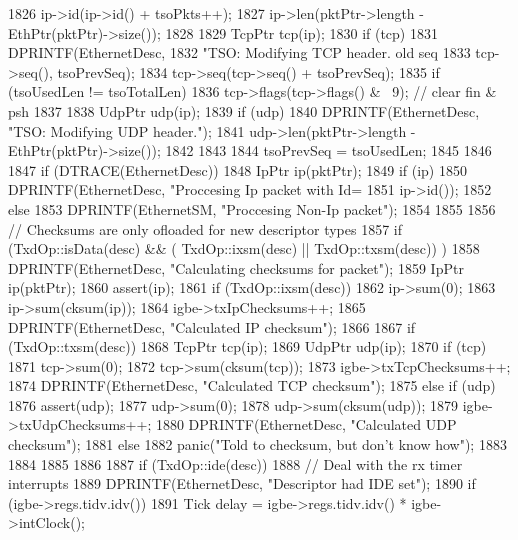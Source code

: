 \begin{DoxyCode}
{{{1826             ip->id(ip->id() + tsoPkts++);
1827             ip->len(pktPtr->length - EthPtr(pktPtr)->size()); 
1828         
1829             TcpPtr tcp(ip);
1830             if (tcp) {
1831                 DPRINTF(EthernetDesc,
1832                         "TSO: Modifying TCP header. old seq %
1833                         tcp->seq(), tsoPrevSeq);
1834                 tcp->seq(tcp->seq() + tsoPrevSeq);
1835                 if (tsoUsedLen != tsoTotalLen)
1836                     tcp->flags(tcp->flags() & ~9); // clear fin & psh
1837             }
1838             UdpPtr udp(ip);
1839             if (udp) {
1840                 DPRINTF(EthernetDesc, "TSO: Modifying UDP header.\n");
1841                 udp->len(pktPtr->length - EthPtr(pktPtr)->size());
1842             }
1843         }
1844         tsoPrevSeq = tsoUsedLen;
1845     }
1846 
1847     if (DTRACE(EthernetDesc)) {
1848         IpPtr ip(pktPtr);
1849         if (ip)
1850             DPRINTF(EthernetDesc, "Proccesing Ip packet with Id=%
1851                     ip->id());
1852         else
1853             DPRINTF(EthernetSM, "Proccesing Non-Ip packet\n");
1854     }
1855 
1856     // Checksums are only ofloaded for new descriptor types
1857     if (TxdOp::isData(desc) && ( TxdOp::ixsm(desc) || TxdOp::txsm(desc)) ) {
1858         DPRINTF(EthernetDesc, "Calculating checksums for packet\n");
1859         IpPtr ip(pktPtr);
1860         assert(ip);
1861         if (TxdOp::ixsm(desc)) {
1862             ip->sum(0);
1863             ip->sum(cksum(ip));
1864             igbe->txIpChecksums++;
1865             DPRINTF(EthernetDesc, "Calculated IP checksum\n");
1866         }
1867         if (TxdOp::txsm(desc)) {
1868             TcpPtr tcp(ip);
1869             UdpPtr udp(ip);
1870             if (tcp) {
1871                 tcp->sum(0);
1872                 tcp->sum(cksum(tcp));
1873                 igbe->txTcpChecksums++;
1874                 DPRINTF(EthernetDesc, "Calculated TCP checksum\n");
1875             } else if (udp) {
1876                 assert(udp);
1877                 udp->sum(0);
1878                 udp->sum(cksum(udp));
1879                 igbe->txUdpChecksums++;
1880                 DPRINTF(EthernetDesc, "Calculated UDP checksum\n");
1881             } else {
1882                 panic("Told to checksum, but don't know how\n");
1883             }
1884         }
1885     }
1886 
1887     if (TxdOp::ide(desc)) {
1888         // Deal with the rx timer interrupts
1889         DPRINTF(EthernetDesc, "Descriptor had IDE set\n");
1890         if (igbe->regs.tidv.idv()) {
1891             Tick delay = igbe->regs.tidv.idv() * igbe->intClock();
}}}
\end{DoxyCode}
